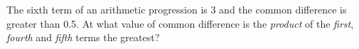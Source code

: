 
%
%
%
%
% 
% 

\question The sixth term of an arithmetic progression is 3 and the common difference is greater than 0.5. 
At what value of common difference is the \textit{product} of the \textit{first}, \textit{fourth} and \textit{fifth}
terms the greatest?

\insertQR{}

\ifprintanswers
\fi 

